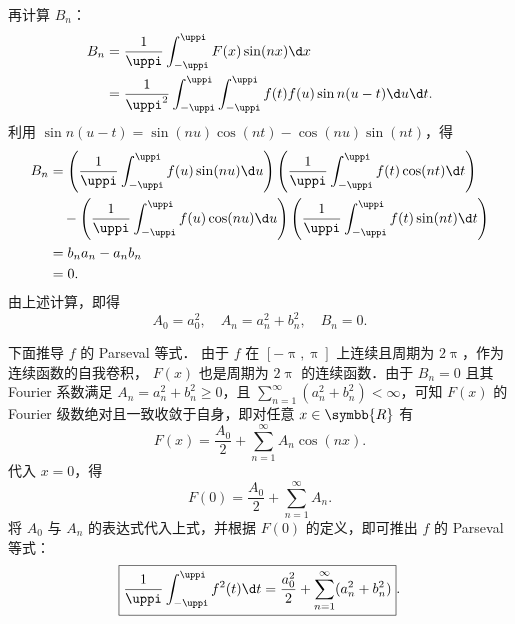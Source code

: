 \begin{myproof}
    再计算 $B_n$：
    \begin{equation}\label{eq:Bn-calc-7}
        \begin{aligned}
            B_n & = \frac{1}{\uppi} \int_{-\uppi}^{\uppi} F(x) \sin(nx) \d x                                       \\
                & = \frac{1}{\uppi^2} \int_{-\uppi}^{\uppi} \int_{-\uppi}^{\uppi} f(t) f(u) \sin n(u-t) \d u \d t.
        \end{aligned}
    \end{equation}
    利用 $\sin n(u-t) = \sin(nu) \cos(nt) - \cos(nu) \sin(nt)$，得
    \begin{equation}
        \begin{aligned}
            B_n & = \left( \frac{1}{\uppi} \int_{-\uppi}^{\uppi} f(u) \sin(nu) \d u \right) \left( \frac{1}{\uppi} \int_{-\uppi}^{\uppi} f(t) \cos(nt) \d t \right)       \\
                & \quad - \left( \frac{1}{\uppi} \int_{-\uppi}^{\uppi} f(u) \cos(nu) \d u \right) \left( \frac{1}{\uppi} \int_{-\uppi}^{\uppi} f(t) \sin(nt) \d t \right) \\
                & = b_n a_n - a_n b_n                                                                                                                                     \\
                & = 0.
        \end{aligned}
    \end{equation}
    由上述计算，即得
    \begin{equation}
        \boxed{A_0 = a_0^2, \quad A_n = a_n^2 + b_n^2, \quad B_n = 0}.
    \end{equation}

    下面推导 $f$ 的 Parseval 等式．
    由于 $f$ 在 $[-\uppi, \uppi]$ 上连续且周期为 $2\uppi$，作为连续函数的自我卷积， $F(x)$ 也是周期为 $2\uppi$ 的连续函数．由于 $B_n = 0$ 且其 Fourier 系数满足 $A_n = a_n^2 + b_n^2 \geqslant 0$，且 $\sum_{n=1}^{\infty} (a_n^2 + b_n^2) < \infty$，可知 $F(x)$ 的 Fourier 级数绝对且一致收敛于自身，即对任意 $x \in \symbb{R}$ 有
    \begin{equation}
        F(x) = \frac{A_0}{2} + \sum_{n=1}^{\infty} A_n \cos(nx).
    \end{equation}
    代入 $x = 0$，得
    \begin{equation}
        F(0) = \frac{A_0}{2} + \sum_{n=1}^{\infty} A_n.
    \end{equation}
    将 $A_0$ 与 $A_n$ 的表达式代入上式，并根据 $F(0)$ 的定义，即可推出 $f$ 的 Parseval 等式：
    \begin{equation}
        \boxed{\frac{1}{\uppi} \int_{-\uppi}^{\uppi} f^2(t) \d t = \frac{a_0^2}{2} + \sum_{n=1}^{\infty} (a_n^2 + b_n^2)}.
    \end{equation}
\end{myproof}

